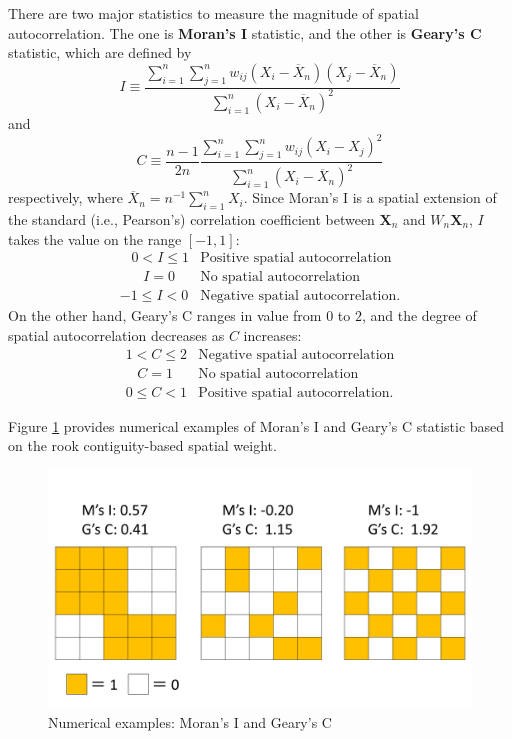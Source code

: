 \documentclass[10.5pt, A4paper, openany, uplatex]{book}
\newcommand{\mbf}{\mathbf}
\renewcommand{\bar}{\overline}
\numberwithin{equation}{section}
\begin{document}
There are two major statistics to measure the magnitude of spatial autocorrelation.
The one is \textbf{Moran's I} statistic, and the other is \textbf{Geary's C} statistic, which are defined by
\[
	I \equiv \frac{\sum_{i=1}^n \sum_{j = 1}^n w_{ij}(X_i - \bar{X}_n) (X_j - \bar{X}_n)}{\sum_{i=1}^n (X_i - \bar{X}_n)^2}
\]
and
\[
	C \equiv \frac{n - 1}{2 n} \frac{\sum_{i=1}^n \sum_{j = 1}^n w_{ij}(X_i - X_j )^2}{\sum_{i=1}^n (X_i - \bar{X}_n)^2}
\]
respectively, where $\bar X_n = n^{-1}\sum_{i=1}^n X_i$.
Since Moran's I is a spatial extension of the standard (i.e., Pearson's) correlation coefficient between $\mbf{X}_n$ and $W_n \mbf{X}_n$, $I$ takes the value on the range $[-1, 1]$:
\[
\begin{array}{ll}
	\;\;\;0 < I \le 1 & \text{Positive spatial autocorrelation} \\
	\;\;\;\;\;\; I = 0 & \text{No spatial autocorrelation} \\
	-1 \leq I < 0 & \text{Negative spatial autocorrelation.}
\end{array}
\]
On the other hand, Geary's C ranges in value from $0$ to $2$, and the degree of spatial autocorrelation decreases as $C$ increases:
\[
\begin{array}{lc}
	1 < C \le 2 & \text{Negative spatial autocorrelation} \\
	\;\;\; C = 1 & \text{No spatial autocorrelation} \\
	0 \leq C < 1 & \text{Positive spatial autocorrelation.}
\end{array}
\]

Figure \ref{fig:IandC} provides numerical examples of Moran's I and Geary's C statistic based on the rook contiguity-based spatial weight.
\begin{figure}[h!]
	\begin{center}
		\includegraphics[width = 12cm]{IandC.png}
		\caption{Numerical examples: Moran's I and Geary's C\label{fig:IandC}}
	\end{center}
\end{figure}
\end{document}
